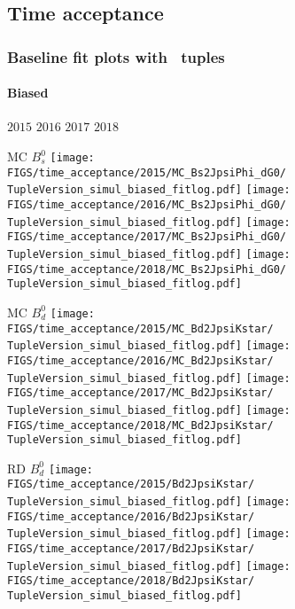 \subsection{Time acceptance}







\begin{frame} %
\frametitle{Baseline fit plots with \TupleVersion\, tuples}
\framesubtitle{Biased}

  \phantom{2020} \hspace*{1.5cm} $2015$ \hspace*{1.5cm} $2016$ \hspace*{1.5cm} $2017$ \hspace*{1.5cm} $2018$

  MC $B_s^0$
  \texttt{[image: \\FIGS/time\_acceptance/2015/MC\_Bs2JpsiPhi\_dG0/\\TupleVersion\_simul\_biased\_fitlog.pdf]}
  \texttt{[image: \\FIGS/time\_acceptance/2016/MC\_Bs2JpsiPhi\_dG0/\\TupleVersion\_simul\_biased\_fitlog.pdf]}
  \texttt{[image: \\FIGS/time\_acceptance/2017/MC\_Bs2JpsiPhi\_dG0/\\TupleVersion\_simul\_biased\_fitlog.pdf]}
  \texttt{[image: \\FIGS/time\_acceptance/2018/MC\_Bs2JpsiPhi\_dG0/\\TupleVersion\_simul\_biased\_fitlog.pdf]}
  \vspace*{2mm}

  MC $B_d^0$
  \texttt{[image: \\FIGS/time\_acceptance/2015/MC\_Bd2JpsiKstar/\\TupleVersion\_simul\_biased\_fitlog.pdf]}
  \texttt{[image: \\FIGS/time\_acceptance/2016/MC\_Bd2JpsiKstar/\\TupleVersion\_simul\_biased\_fitlog.pdf]}
  \texttt{[image: \\FIGS/time\_acceptance/2017/MC\_Bd2JpsiKstar/\\TupleVersion\_simul\_biased\_fitlog.pdf]}
  \texttt{[image: \\FIGS/time\_acceptance/2018/MC\_Bd2JpsiKstar/\\TupleVersion\_simul\_biased\_fitlog.pdf]}
  \vspace*{2mm}

  RD $B_d^0$
  \texttt{[image: \\FIGS/time\_acceptance/2015/Bd2JpsiKstar/\\TupleVersion\_simul\_biased\_fitlog.pdf]}
  \texttt{[image: \\FIGS/time\_acceptance/2016/Bd2JpsiKstar/\\TupleVersion\_simul\_biased\_fitlog.pdf]}
  \texttt{[image: \\FIGS/time\_acceptance/2017/Bd2JpsiKstar/\\TupleVersion\_simul\_biased\_fitlog.pdf]}
  \texttt{[image: \\FIGS/time\_acceptance/2018/Bd2JpsiKstar/\\TupleVersion\_simul\_biased\_fitlog.pdf]}

\end{frame} %



